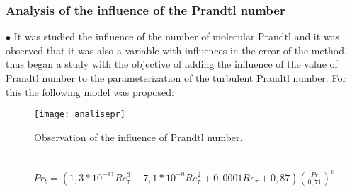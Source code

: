 \documentclass[xcolor=dvipsnames,8pt,aspectratio=34]{beamer}
\begin{document}
		\begin{frame}
		\frametitle{Analysis of the influence of the Prandtl number}
		\begin{minipage}[h!]{0.45\textwidth}
			$\bullet$ It was studied the influence of the number of molecular Prandtl and it was observed that it was also a variable with influences in the error of the method, thus began a study with the objective of adding the influence of the value of Prandtl number to the parameterization of the turbulent Prandtl number. For this the following model was proposed:
		\end{minipage}
		\begin{minipage}[h!]{0.45\textwidth}
			\begin{figure}
				\centering
				\texttt{[image: analisepr]}
				\caption{Observation of the influence of Prandtl number.}
			\end{figure}
		\end{minipage}\\
		\begin{equation}
		\begin{split}
		Pr_t = \left( 1,3 * 10^{-11} Re_\tau^3 - 7,1 * 10^{-8} Re_\tau^2 + 0,0001 Re_\tau + 0,87 \right) \left(  \frac{Pr}{0,71}\right) ^{v}
		\end{split}
		\end{equation}
		\end{frame}
		
		
		
		
		
\end{document}
